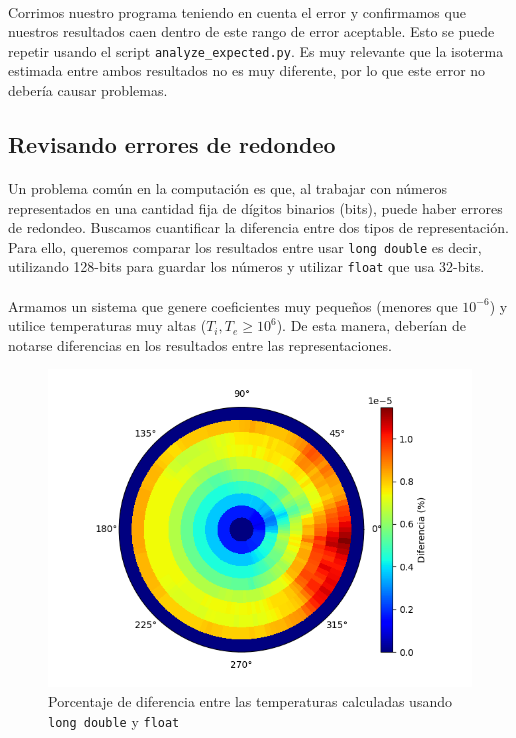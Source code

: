 \documentclass[12pt]{article}
\begin{document}
\paragraph{} Corrimos nuestro programa teniendo en cuenta el error y confirmamos que nuestros resultados caen dentro de este rango de error aceptable. Esto se puede repetir usando el script \texttt{analyze\_expected.py}. Es muy relevante que la isoterma estimada entre ambos resultados no es muy diferente, por lo que este error no debería causar problemas. %

\subsection{Revisando errores de redondeo}
\label{sec:rounding}

\paragraph{} Un problema común en la computación es que, al trabajar con números representados en una cantidad fija de dígitos binarios (bits), puede haber errores de redondeo. Buscamos cuantificar la diferencia entre dos tipos de representación. Para ello, queremos comparar los resultados entre usar \texttt{long double} es decir, utilizando 128-bits para guardar los números y utilizar \texttt{float} que usa 32-bits. 
\paragraph{} Armamos un sistema que genere coeficientes muy pequeños (menores que \(10^{-6}\)) y utilice temperaturas muy altas (\(T_i, T_e \geq 10^6\)). De esta manera, deberían de notarse diferencias en los resultados entre las representaciones.

\begin{figure}[H]
\centering
\includegraphics[scale=0.5]{rounding.temperature}
\caption{Porcentaje de diferencia entre las temperaturas calculadas usando \texttt{long double} y \texttt{float}}
\label{fig:rounding.diffs}
\end{figure}
\end{document}
